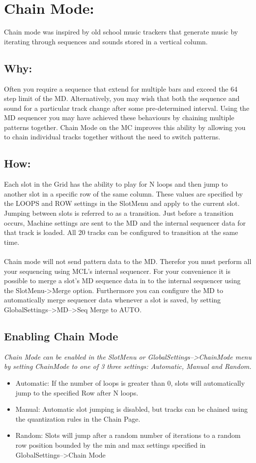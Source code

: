 \chapter{Chain Mode:}
Chain mode was inspired by old school music trackers that generate music by iterating through sequences and sounds stored in a vertical column.
\section{Why:}
Often you require a sequence that extend for multiple bars and exceed the 64 step limit of the MD. Alternatively, you may wish that both the sequence and sound for a particular track change after some pre-determined interval. Using the MD sequencer you may have achieved these behaviours by chaining multiple patterns together. Chain Mode on the MC improves this ability by allowing you to chain individual tracks together without the need to switch patterns.
\section{How:}
Each slot in the Grid has the ability to play for N loops and then jump to another slot in a specific row of the same column.  These values are specified by the LOOPS and ROW settings in the SlotMenu and apply to the current slot. Jumping between slots is referred to as a transition. Just before a transition occurs, Machine settings are sent to the MD and the internal sequencer data for that track is loaded. All 20 tracks can be configured to transition at the same time.\\
 \\
Chain mode will not send pattern data to the MD. Therefor you must perform all your sequencing using MCL's internal sequencer. For your convenience it is possible to merge a slot's MD sequence data in to the internal sequencer using the SlotMenu->Merge option. Furthermore you can configure the MD to automatically merge sequencer data whenever a slot is saved, by setting GlobalSettings-->MD-->Seq Merge to AUTO.
\section{Enabling Chain Mode}
\textit{Chain Mode can be enabled in the SlotMenu or GlobalSettings-->ChainMode menu by setting ChainMode to one of 3 three settings: Automatic, Manual and Random.}

\begin{itemize}
	\item Automatic: If the number of loops is greater than 0, slots will automatically jump to the specified Row after N loops.
	\item Manual: Automatic slot jumping is disabled, but tracks can be chained using the quantization rules in the Chain Page.
	\item Random: Slots will jump after a random number of iterations to a random row position bounded by the min and max settings specified in GlobalSettings-->Chain Mode
\end{itemize}


